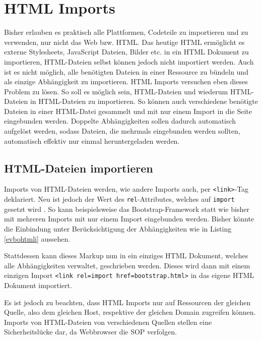 \section{HTML Imports}\label{html-imports}

Bisher erlauben es praktisch alle Plattformen, Codeteile zu importieren und zu verwenden, nur nicht das Web bzw. \ac{HTML}. Das heutige \ac{HTML} ermöglicht es externe Stylesheets, JavaScript Dateien, Bilder etc. in ein \ac{HTML} Dokument zu importieren, \ac{HTML}-Dateien selbst können jedoch nicht importiert werden. Auch ist es nicht möglich, alle benötigten Dateien in einer Ressource zu bündeln und als einzige Abhängigkeit zu importieren. \ac{HTML} Imports versuchen eben dieses Problem zu lösen. So soll es möglich sein, \ac{HTML}-Dateien und wiederum \ac{HTML}-Dateien in \ac{HTML}-Dateien zu importieren. So können auch verschiedene benötigte Dateien in einer \ac{HTML}-Datei gesammelt und mit nur einem Import in die Seite eingebunden werden. Doppelte Abhängigkeiten sollen dadurch automatisch aufgelöst werden, sodass Dateien, die mehrmals eingebunden werden sollten, automatisch effektiv nur einmal heruntergeladen werden.


\subsection{HTML-Dateien importieren}\label{html-dateien-importieren}

Imports von \ac{HTML}-Dateien werden, wie andere Imports auch, per \texttt{\textless{}link\textgreater{}}-Tag deklariert. Neu ist jedoch der Wert des \texttt{rel}-Attributes, welches auf \texttt{import} gesetzt wird \cite[S. 139--147]{citeulike:13844975}. So kann beispielsweise das Bootstrap-Frame\-work statt wie bisher mit mehreren Imports mit nur einem Import eingebunden werden. Bisher könnte die Einbindung unter Berücksichtigung der Abhängigkeiten wie in Listing \ref{evbohtmli} aussehen.



Stattdessen kann dieses Markup nun in ein einziges \ac{HTML} Dokument, welches alle Abhängigkeiten verwaltet, geschrieben werden. Dieses wird dann mit einem einzigen Import \texttt{\textless{}link\ rel=\dq import\dq\ href=\dq bootstrap.html\dq\textgreater{}} in das eigene \ac{HTML} Dokument importiert.

Es ist jedoch zu beachten, dass \ac{HTML} Imports nur auf Ressourcen der gleichen Quelle, also dem gleichen Host, respektive der gleichen Domain zugreifen können. Imports von \ac{HTML}-Dateien von verschiedenen Quellen stellen eine Sicherheitslücke dar, da Webbrowser die \ac{SOP} verfolgen.

